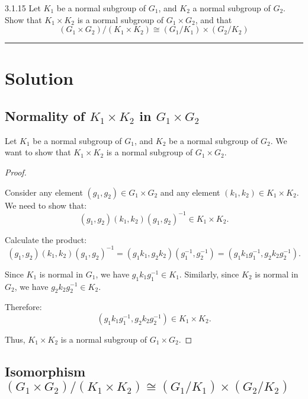 \documentclass[12pt]{amsart}
\theoremstyle{definition}
\numberwithin{equation}{section}
\begin{document}
\begin{exercise}{3.1.15} Let \(K_1\) be a normal subgroup of \(G_1\), and \(K_2\) a normal subgroup of \(G_2\). Show that \(K_1 \times K_2\) is a normal subgroup of \(G_1 \times G_2\), and that \[(G_1 \times G_2)/(K_1\times K_2) \cong (G_1/K_1) \times (G_2/K_2)\]
    
    \noindent\rule{\linewidth}{1pt}
    
    \section*{Solution}
    
    \subsection*{Normality of \(K_1 \times K_2\) in \(G_1 \times G_2\)}
    
    Let \(K_1\) be a normal subgroup of \(G_1\), and \(K_2\) be a normal subgroup of \(G_2\). We want to show that \(K_1 \times K_2\) is a normal subgroup of \(G_1 \times G_2\).
    
    \begin{proof} \( \)
    
    Consider any element \((g_1, g_2) \in G_1 \times G_2\) and any element \((k_1, k_2) \in K_1 \times K_2\). We need to show that:
    \[
    (g_1, g_2)(k_1, k_2)(g_1, g_2)^{-1} \in K_1 \times K_2.
    \]
    
    Calculate the product:
    \[
    (g_1, g_2)(k_1, k_2)(g_1, g_2)^{-1} = (g_1 k_1, g_2 k_2) (g_1^{-1}, g_2^{-1}) = (g_1 k_1 g_1^{-1}, g_2 k_2 g_2^{-1}).
    \]
    
    Since \(K_1\) is normal in \(G_1\), we have \(g_1 k_1 g_1^{-1} \in K_1\). Similarly, since \(K_2\) is normal in \(G_2\), we have \(g_2 k_2 g_2^{-1} \in K_2\).
    
    Therefore:
    \[
    (g_1 k_1 g_1^{-1}, g_2 k_2 g_2^{-1}) \in K_1 \times K_2.
    \]
    
    Thus, \(K_1 \times K_2\) is a normal subgroup of \(G_1 \times G_2\).
    
    \end{proof}
    
    \subsection*{Isomorphism \((G_1 \times G_2)/(K_1 \times K_2) \cong (G_1/K_1) \times (G_2/K_2)\)}
    

\end{exercise}
\end{document}
